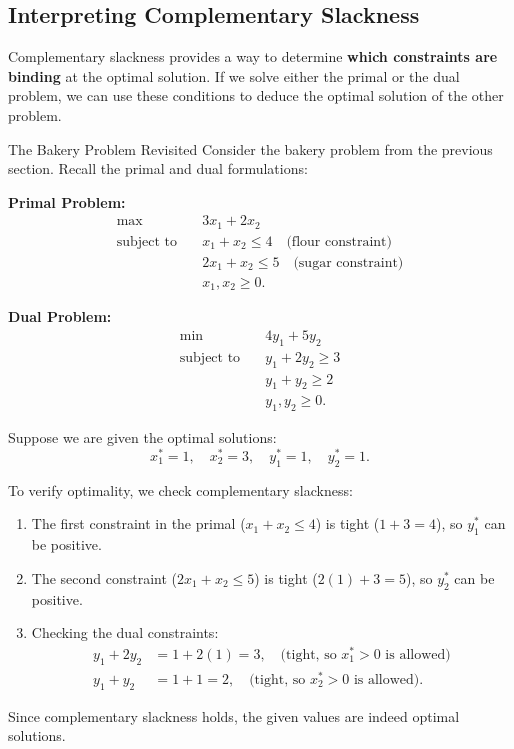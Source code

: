 \subsection{Interpreting Complementary Slackness}
Complementary slackness provides a way to determine 	\textbf{which constraints are binding} at the optimal solution. If we solve either the primal or the dual problem, we can use these conditions to deduce the optimal solution of the other problem.

\begin{example}{The Bakery Problem Revisited}\label{example:cs-bakery-revisited}
Consider the bakery problem from the previous section. Recall the primal and dual formulations:

\textbf{Primal Problem:}
\begin{align*}
\max \quad & 3x_1 + 2x_2 \\
\text{subject to} \quad & x_1 + x_2 \leq 4 \quad \text{(flour constraint)} \\
& 2x_1 + x_2 \leq 5 \quad \text{(sugar constraint)} \\
& x_1, x_2 \geq 0.
\end{align*}

\textbf{Dual Problem:}
\begin{align*}
\min \quad & 4y_1 + 5y_2 \\
\text{subject to} \quad & y_1 + 2y_2 \geq 3 \\
& y_1 + y_2 \geq 2 \\
& y_1, y_2 \geq 0.
\end{align*}

Suppose we are given the optimal solutions:
\[
x_1^* = 1, \quad x_2^* = 3, \quad y_1^* = 1, \quad y_2^* = 1.
\]

To verify optimality, we check complementary slackness:
\begin{enumerate}
\item The first constraint in the primal ($x_1 + x_2 \leq 4$) is tight ($1+3=4$), so $y_1^*$ can be positive.
\item  The second constraint ($2x_1 + x_2 \leq 5$) is tight ($2(1) + 3 = 5$), so $y_2^*$ can be positive.
\item  Checking the dual constraints:
   \begin{align*}
   y_1 + 2y_2 &= 1 + 2(1) = 3, \quad \text{(tight, so $x_1^* > 0$ is allowed)} \\
   y_1 + y_2 &= 1 + 1 = 2, \quad \text{(tight, so $x_2^* > 0$ is allowed)}.
   \end{align*}
\end{enumerate}
Since complementary slackness holds, the given values are indeed optimal solutions.
\end{example}

